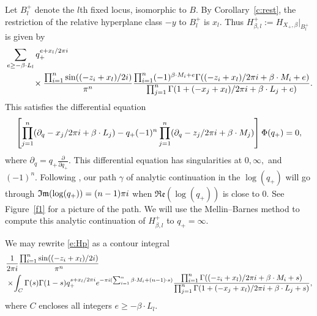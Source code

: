 \documentclass[11pt]{article}
\numberwithin{equation}{section}
\numberwithin{equation}{section}
\newcommand{\MB}{M}
\newcommand{\LB}{L}
\newcommand{\z}{z}
\newcommand{\x}{x}
\begin{document}
Let $B_l^{+}$ denote the $l$th fixed locus, isomorphic to $B$. By Corollary~\ref{c:rest}, the restriction of the relative hyperplane class $-y$ to $B_l^{+}$ is $ \x_l$. Thus $H_{\beta,l}^{+} :=H_{X_{+}, \beta}|_{B_l^{+}}$ is given by
\begin{align}
&\sum_{e \geq -\beta \cdot \LB_l} q_+^{e+ \x_l/2 \pi {\rm i}}\nonumber\\
&\hphantom{\sum_{e \geq -\beta \cdot \LB_l}}{}\times\frac{ \prod_{i=1}^n \sin( (-\z_i+\x_l)/2 {\rm i}) }{\pi^n}\frac{\prod_{i=1}^n (-1)^{\beta \cdot \MB_i + e}\Gamma((-\z_i+\x_l)/2 \pi {\rm i} + \beta \cdot \MB_i + e)}
{\prod_{j=1}^n \Gamma(1 + (- \x_j+\x_l)/2 \pi {\rm i} + \beta \cdot \LB_j+e) }.\label{e:Hp}
\end{align}
This satisfies the differential equation
\[
\left[\prod_{j=1}^n (\partial_q -x_j/2 \pi {\rm i} + \beta \cdot L_j) - q_+(-1)^n\prod_{j=1}^n (\partial_q -z_j/2 \pi {\rm i} + \beta \cdot M_j) \right] \Phi(q_+) = 0,
\]
where $\partial_q = q_{+} \frac{\partial}{\partial q_{+}}$. This differential equation has singularities at $0, \infty,$ and $(-1)^n$. Following \cite{CIJ}, our path $\gamma$ of analytic continuation in the $\log(q_{+})$ will go through $\mathfrak{Im}(\log(q_{+})) = (n-1)\pi {\rm i}$ when $\mathfrak{Re}(\log(q_{+}))$ is close to 0. See Figure~\ref{f1} for a picture of the path.
We will use the Mellin--Barnes method to compute this analytic continuation of $H_{\beta,l}^{+}$ to $q_+ = \infty$.

We may rewrite \eqref{e:Hp} as a contour integral
\begin{align} \label{e:cint}&\frac{1}{2 \pi {\rm i}}\frac{ \prod_{i=1}^n \sin( (-\z_i+\x_l)/2 {\rm i}) }{\pi^n} \\
&\times\! \int_C \Gamma( s) \Gamma(1 - s) q_+^{s + \x_l/2 \pi {\rm i}} {\rm e}^{ -\pi {\rm i} (\sum_{i=1}^n \beta \cdot \MB_i+(n-1)\cdot s)} \frac{ \prod_{i=1}^n \Gamma((-\z_i+\x_l)/2 \pi {\rm i} + \beta \cdot \MB_i + s)}
{\prod_{j=1}^n \Gamma(1 + (- \x_j+\x_l)/2 \pi {\rm i} + \beta \cdot \LB_j+s) },
\nonumber \end{align}
where $C$ encloses all integers $e \geq -\beta \cdot \LB_l$.
\end{document}

